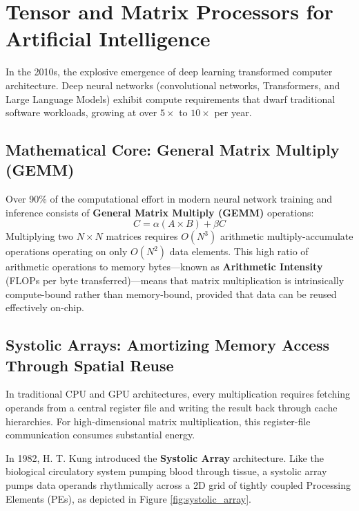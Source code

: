 \section{Tensor and Matrix Processors for Artificial Intelligence}\label{sec:tensor_matrix_processors}

In the 2010s, the explosive emergence of deep learning transformed computer architecture. Deep neural networks (convolutional networks, Transformers, and Large Language Models) exhibit compute requirements that dwarf traditional software workloads, growing at over $5\times$ to $10\times$ per year.

\subsection{Mathematical Core: General Matrix Multiply (GEMM)}
Over 90\% of the computational effort in modern neural network training and inference consists of \textbf{General Matrix Multiply (GEMM)} operations:
\begin{equation}
C = \alpha (A \times B) + \beta C
\end{equation}
Multiplying two $N \times N$ matrices requires $O(N^3)$ arithmetic multiply-accumulate operations operating on only $O(N^2)$ data elements. This high ratio of arithmetic operations to memory bytes—known as \textbf{Arithmetic Intensity} (FLOPs per byte transferred)—means that matrix multiplication is intrinsically compute-bound rather than memory-bound, provided that data can be reused effectively on-chip.

\subsection{Systolic Arrays: Amortizing Memory Access Through Spatial Reuse}
In traditional CPU and GPU architectures, every multiplication requires fetching operands from a central register file and writing the result back through cache hierarchies. For high-dimensional matrix multiplication, this register-file communication consumes substantial energy.

In 1982, H. T. Kung introduced the \textbf{Systolic Array} architecture. Like the biological circulatory system pumping blood through tissue, a systolic array pumps data operands rhythmically across a 2D grid of tightly coupled Processing Elements (PEs), as depicted in Figure \ref{fig:systolic_array}.

